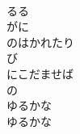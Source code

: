 \documentclass[10pt,b5j]{tarticle} %
\begin{document}
\begin{enumerate}
\begin{minipage}[c]{\blocksize}
    \end{minipage}
    \begin{minipage}[c]{\blocksize}
        
        \vspace{\linespace}
        \item~\\
        るる\\
        がに\\
        のはかれたり\\
        び\\
        にこだませば\\
        の\\
        ゆるかな\\
        ゆるかな
    
    \end{minipage}
\end{enumerate} %
\end{document}

